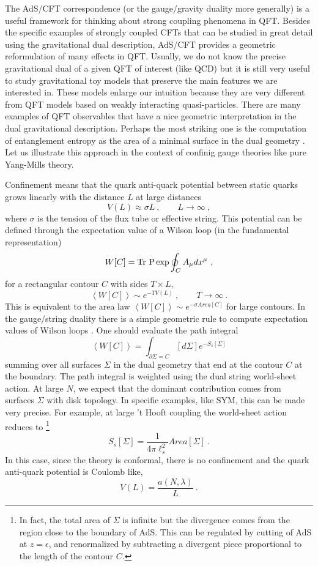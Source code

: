\documentclass{ws-rv9x6}
\newcommand\be{\begin{equation}}
\newcommand\ee{\end{equation}}
\begin{document}
The AdS/CFT correspondence (or the gauge/gravity duality more generally)
is a useful framework for thinking about strong coupling phenomena
in QFT. Besides the specific examples of strongly coupled CFTs that
can be studied in great detail using the gravitational dual description,
AdS/CFT provides a geometric reformulation of many effects in QFT.
Usually, we do not know the precise gravitational dual of a given
QFT of interest (like QCD) but it is still very useful to study gravitational
toy models that preserve the main features we are interested in. These
models enlarge our intuition because they are very different from
QFT models based on weakly interacting quasi-particles. There are
many examples of QFT observables that have a nice geometric interpretation
in the dual gravitational description. Perhaps the most striking one
is the computation of entanglement entropy as the area of a minimal
surface in the dual geometry \cite{hep-th/0603001}. Let us illustrate
this approach in the context of confinig gauge theories like pure
Yang-Mills theory.

Confinement means that the quark anti-quark potential between static
quarks grows linearly with the distance $L$ at large distances
\be
V(L)\approx\sigma L\ ,\qquad L\to\infty\ ,
\ee
where $\sigma$ is the tension of the flux tube or effective string.
This potential can be defined through the expectation value of a Wilson
loop (in the fundamental representation)
\be
W[C]={\rm Tr\ P}\exp\oint_{C}A_{\mu}dx^{\mu}\ ,
\ee
for a rectangular contour $C$ with sides $T\times L$,
\be
\left\langle W[C]\right\rangle \sim e^{-TV(L)}\ ,\qquad T\to\infty\:.
\ee
This is equivalent to the area law $\left\langle W[C]\right\rangle \sim e^{-\sigma Area[C]}$
for large contours. In the gauge/string duality there is a simple
geometric rule to compute expectation values of Wilson loops \cite{hep-th/9803002}.
One should evaluate the path integral 
\begin{equation}
\left\langle W[C]\right\rangle =\int_{\partial\Sigma=C}[d\Sigma]e^{-S_{s}[\Sigma]}\label{eq:stringpathintegral}
\end{equation}
summing over all surfaces $\Sigma$ in the dual geometry that end
at the contour $C$ at the boundary. The path integral is weighted
using the dual string world-sheet action. At large $N$, we expect
that the dominant contribution comes from surfaces $\Sigma$ with
disk topology. In specific examples, like SYM, this can be made very
precise. For example, at large 't Hooft coupling the world-sheet action
reduces to %
\footnote{In fact, the total area of $\Sigma$ is infinite but the divergence
comes from the region close to the boundary of AdS. This can be regulated
by cutting of AdS at $z=\epsilon$, and renormalized by subtracting
a divergent piece proportional to the length of the contour $C$.%
}
\begin{equation}
S_{s}[\Sigma]=\frac{1}{4\pi\ell_{s}^{2}}Area[\Sigma]\ .\label{eq:worldsheetAction}
\end{equation}
In this case, since the theory is conformal, there is no confinement
and the quark anti-quark potential is Coulomb like, 
\be
V(L)=\frac{a(N,\lambda)}{L}\ .
\ee
\end{document}
